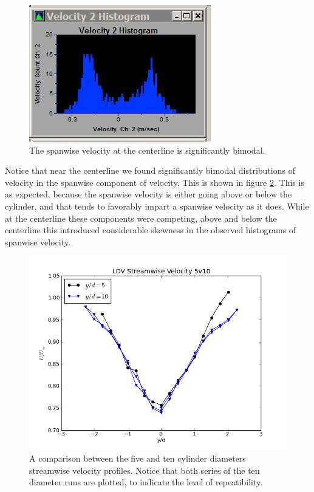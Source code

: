 \documentclass{article}
\begin{document}
\begin{figure}[!htb]
 \begin{center}
  \includegraphics[width = 12 cm]{figs/backflow}
  \caption{The spanwise velocity at the centerline is
  significantly bimodal. }
  \label{back}
 \end{center}
\end{figure}

Notice that near the centerline we found significantly bimodal
distributions of velocity in the spanwise component of velocity. This is
shown in figure \ref{back}. This is as expected, because the spanwise
velocity is either going above or below the cylinder, and that tends to
favorably impart a spanwise velocity as it does. While at the centerline
these components were competing, above and below the centerline this
introduced considerable skewness in the observed histograms of spanwise
velocity. 

\begin{figure}[!htb]
 \begin{center}
  \includegraphics[width = 12 cm]{figs/defect10}
  \caption{A comparison between the five and ten cylinder diameters
  streamwise velocity profiles. Notice that both series of the ten diameter runs are plotted, to 
indicate the level of repeatibility. }
  \label{back}
 \end{center}
\end{figure}
\end{document}
